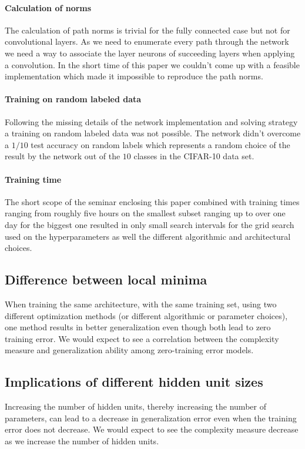 \paragraph{Calculation of norms}
The calculation of path norms is trivial for the fully connected case but not for convolutional layers. As we need to enumerate every path through the network we need a way to associate the layer neurons of succeeding layers when applying a convolution. In the short time of this paper we couldn't come up with a feasible implementation which made it impossible to reproduce the path norms.
%
\paragraph{Training on random labeled data}
Following the missing details of the network implementation and solving strategy a training on random labeled data was not possible. The network didn't overcome a $1/10$ test accuracy on random labels which represents a random choice of the result by the network out of the $10$ classes in the CIFAR-10 data set.

\paragraph{Training time}
The short scope of the seminar enclosing this paper combined with training times ranging from roughly five hours on the smallest subset ranging up to over one day for the biggest one resulted in only small search intervals for the grid search used on the hyperparameters as well the different algorithmic and architectural choices.
%
\subsection{Difference between local minima}
When training the same architecture, with the same training set, using two different optimization methods (or different algorithmic or parameter choices), one method results
in better generalization even though both lead to zero training error. We would
expect to see a correlation between the complexity measure and generalization ability among
zero-training error models. \cite{neyshabur2017exploring}

\subsection{Implications of different hidden unit sizes}
Increasing the number of hidden units, thereby increasing the number of parameters, can
lead to a decrease in generalization error even when the training error does not decrease.
We would expect to see the complexity measure decrease as we increase the number of
hidden units. \cite{neyshabur2017exploring} 